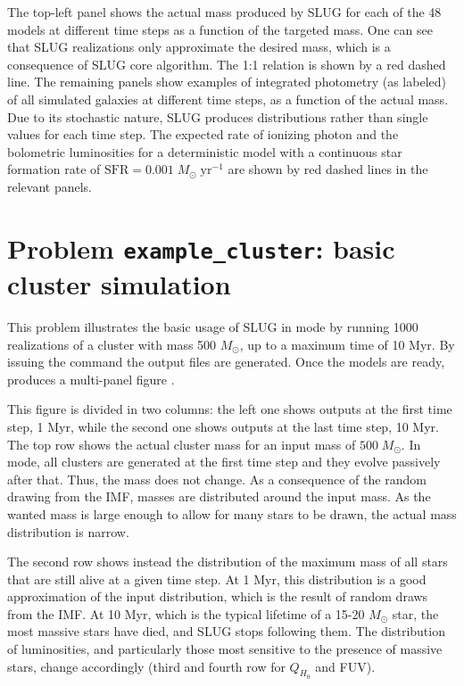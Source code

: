 \documentclass[letterpaper,10pt,english]{sphinxmanual}
\begin{document}
The top-left panel shows the actual mass produced by SLUG for each of the 48 models at different time steps as a
function of the targeted mass. One can see that SLUG realizations only approximate the desired mass, which is a consequence
of SLUG core algorithm. The 1:1 relation is shown by a red dashed line.
The remaining panels show examples of integrated photometry (as labeled) of all simulated galaxies
at different time steps, as a function of the actual mass. Due to its stochastic nature, SLUG produces
distributions rather than single values for each time step. The expected rate of ionizing
photon and the bolometric luminosities for a deterministic model with a
continuous star formation rate of \(\mathrm{SFR}=0.001\; M_\odot\;\mathrm{yr}^{-1}\) are shown
by red dashed lines in the relevant panels.


\section{Problem \texttt{example\_cluster}: basic cluster simulation}
\label{tests:problem-example-cluster-basic-cluster-simulation}
This problem illustrates the basic usage of SLUG in  mode by running 1000 realizations of a cluster
with mass 500 \(M_\odot\), up to a maximum time of 10 Myr. By issuing the command
 the output files  are
generated. Once the models are ready,  produces a multi-panel
figure .

This figure is divided in two columns: the left one shows outputs at the first time step, 1 Myr, while
the second one shows outputs at the last time step, 10 Myr.  The top row shows the actual cluster mass for an
input mass of \(500\;M_\odot\).
In  mode, all clusters are generated at the first time step and they evolve
passively after that. Thus, the mass does not change. As a consequence of the
random drawing from the IMF, masses are distributed around the input mass.
As the wanted mass is large enough to allow for many stars to be drawn, the
actual mass distribution is narrow.

The second row shows instead the distribution of the maximum mass of all stars that are still
alive at a given time step. At 1 Myr, this distribution is a good approximation of the
input distribution, which is the result of random draws from the IMF. At 10 Myr, which is the
typical lifetime of a 15-20 \(M_\odot\) star, the most massive stars have died, and
SLUG stops following them. The distribution of luminosities, and particularly those
most sensitive to the presence of massive stars, change accordingly
(third and fourth row for \(Q_{H_0}\) and FUV).
\end{document}
